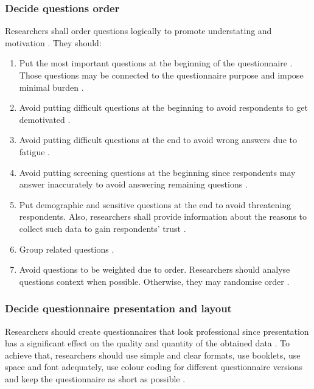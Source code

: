 \subsubsection{Decide questions order}
Researchers shall order questions logically to promote understating and motivation \autocite{Diem,Krosnick2009}. They should:
\begin{enumerate}
    \item Put the most important questions at the beginning of the questionnaire \autocite{Diem}. Those questions may be connected to the questionnaire purpose and impose minimal burden \autocite{Krosnick2009}.
    
    \item Avoid putting difficult questions at the beginning to avoid respondents to get demotivated \autocite{Krosnick2009}.
    
    \item Avoid putting difficult questions at the end to avoid wrong answers due to fatigue \autocite{Krosnick2009}.
    
    \item Avoid putting screening questions at the beginning since respondents may answer inaccurately to avoid answering remaining questions \autocite{Krosnick2009}.
    
    \item Put demographic and sensitive questions at the end to avoid threatening respondents. Also, researchers shall provide information about the reasons to collect such data to gain respondents' trust \autocite{Boynton2004b,Krosnick2009}.
    
    \item Group related questions \autocite{Krosnick2009}.
    
    \item Avoid questions to be weighted due to order. Researchers should analyse questions context when possible. Otherwise, they may randomise order \autocite{Krosnick2009}.
\end{enumerate}

\subsubsection{Decide questionnaire presentation and layout}
Researchers should create questionnaires that look professional since presentation has a significant effect on the quality and quantity of the obtained data \autocite{Diem,Crawford1997}. To achieve that, researchers should use simple and clear formats, use booklets, use space and font adequately, use colour coding for different questionnaire versions and keep the questionnaire as short as possible \autocite{Crawford1997}.


